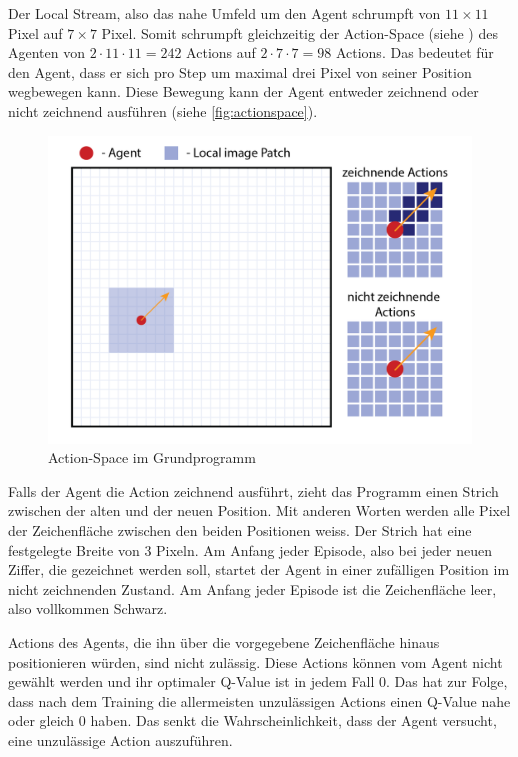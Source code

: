 Der Local Stream, also das nahe Umfeld um den Agent schrumpft von $11\times11$
Pixel auf $7\times7$ Pixel. Somit schrumpft gleichzeitig der Action-Space (siehe
) des Agenten von $2\cdot11\cdot11 = 242$ Actions auf
$2\cdot7\cdot7 = 98$ Actions. Das bedeutet für den Agent, dass er sich pro Step
um maximal drei Pixel von seiner Position wegbewegen kann. Diese Bewegung kann
der Agent entweder zeichnend oder nicht zeichnend ausführen (siehe
\autoref{fig:actionspace}).

\begin{figure}[!ht]
  \centering
  \includegraphics[width=\textwidth]{images/methode/actionspace.png}
  \caption{Action-Space im Grundprogramm}
  \label{fig:actionspace}
\end{figure}


Falls der Agent die Action zeichnend ausführt, zieht das Programm einen Strich
zwischen der alten und der neuen Position. Mit anderen Worten werden alle Pixel
der Zeichenfläche zwischen den beiden Positionen weiss. Der Strich hat eine
festgelegte Breite von $3$ Pixeln. Am Anfang jeder Episode, also bei jeder neuen
Ziffer, die gezeichnet werden soll, startet der Agent in einer zufälligen
Position im nicht zeichnenden Zustand. Am Anfang jeder Episode ist die
Zeichenfläche leer, also vollkommen Schwarz.

Actions des Agents, die ihn über die vorgegebene Zeichenfläche hinaus
positionieren würden, sind nicht zulässig. Diese Actions können vom Agent nicht
gewählt werden und ihr optimaler Q-Value ist in jedem Fall $0$. Das hat zur
Folge, dass nach dem Training die allermeisten unzulässigen Actions einen
Q-Value nahe oder gleich $0$ haben. Das senkt die Wahrscheinlichkeit, dass der
Agent versucht, eine unzulässige Action auszuführen.

